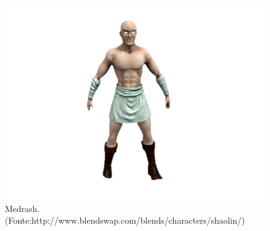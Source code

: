 \begin{figure}[H]
 \centering
 \includegraphics[scale=1]{Imagens/medrash01.png}
 \caption{Medrash.(Fonte:http://www.blendswap.com/blends/characters/shaolin/)}
\label{img:medrash}
\end{figure}

